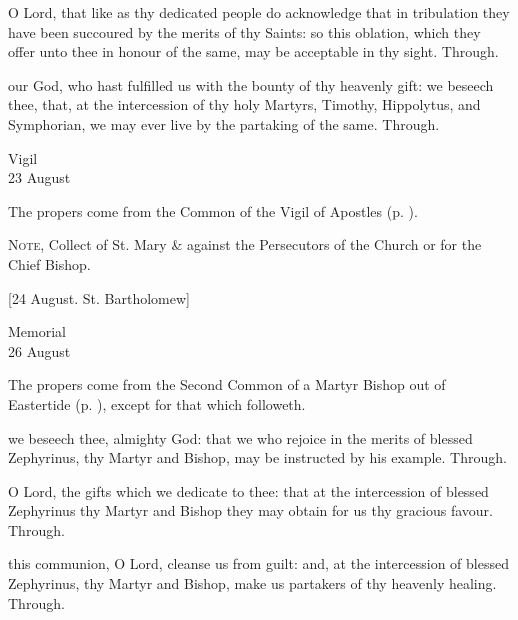 \secret
{} O Lord, that like as thy dedicated people do acknowledge that in tribulation they have been succoured by the merits of thy Saints: so this oblation, which they offer unto thee in honour of the same, may be acceptable in thy sight. Through.

\postcommunion
{} our God, who hast fulfilled us with the bounty of thy heavenly gift: we beseech thee, that, at the intercession of thy holy Martyrs, Timothy, Hippolytus, and Symphorian, we may ever live by the partaking of the same. Through.


\begin{inhead}
    {Vigil\\
23 August}
\end{inhead}

\begin{rubric}
	The propers come from the Common of the Vigil of Apostles (p. \pageref{CommonVigilApostles}).\par
	\textsc{Note,}  Collect of St. Mary \&  against the Persecutors of the Church or for the Chief Bishop.
\end{rubric}


\begin{center}
	[24 August. St. Bartholomew]
\end{center}

\begin{inhead}
    {Memorial\\
26 August}
\end{inhead}

\begin{rubric}
	The propers come from the Second Common of a Martyr Bishop out of Eastertide (p. \pageref{CommonMartyrBishopII}), except for that which followeth.
\end{rubric}

\collect
{} we beseech thee, almighty God: that we who rejoice in the merits of blessed Zephyrinus, thy Martyr and Bishop, may be instructed by his example. Through.

\secret
{} O Lord, the gifts which we dedicate to thee: that at the intercession of blessed Zephyrinus thy Martyr and Bishop they may obtain for us thy gracious favour. Through.

\postcommunion
{} this communion, O Lord, cleanse us from guilt: and, at the intercession of blessed Zephyrinus, thy Martyr and Bishop, make us partakers of thy heavenly healing. Through.

